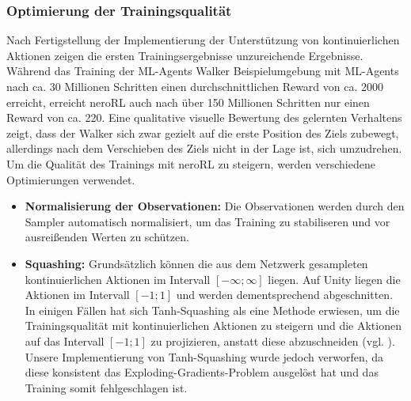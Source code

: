 \subsubsection{Optimierung der Trainingsqualität}
Nach Fertigstellung der Implementierung der Unterstützung von kontinuierlichen Aktionen zeigen die ersten Trainingsergebnisse unzureichende Ergebnisse. Während das Training der ML-Agents Walker Beispielumgebung mit ML-Agents nach ca. 30 Millionen Schritten einen durchschnittlichen Reward von ca. 2000 erreicht, erreicht neroRL auch nach über 150 Millionen Schritten nur einen Reward von ca. 220. Eine qualitative visuelle Bewertung des gelernten Verhaltens zeigt, dass der Walker sich zwar gezielt auf die erste Position des Ziels zubewegt, allerdings nach dem Verschieben des Ziels nicht in der Lage ist, sich umzudrehen. 
Um die Qualität des Trainings mit neroRL zu steigern, werden verschiedene Optimierungen verwendet.

\begin{itemize}
	\item \textbf{Normalisierung der Observationen:} Die Observationen werden durch den Sampler automatisch normalisiert, um das Training zu stabiliseren und vor ausreißenden Werten zu schützen.
	\item \textbf{Squashing:} Grundsätzlich können die aus dem Netzwerk gesampleten kontinuierlichen Aktionen im Intervall $[-\infty;\infty]$ liegen. Auf Unity liegen die Aktionen im Intervall $[-1;1]$ und werden dementsprechend abgeschnitten. In einigen Fällen hat sich Tanh-Squashing als eine Methode erwiesen, um die Trainingsqualität mit kontinuierlichen Aktionen zu steigern und die Aktionen auf das Intervall $[-1;1]$ zu projizieren, anstatt diese abzuschneiden (vgl. \cite{}). Unsere Implementierung von Tanh-Squashing wurde jedoch verworfen, da diese konsistent das Exploding-Gradients-Problem ausgelöst hat und das Training somit fehlgeschlagen ist. 
\end{itemize}


